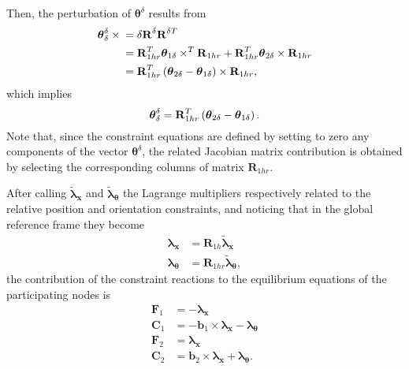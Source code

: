 \documentclass[10pt,dvips,fleqn,subeqn]{report}
\newcommand{\T}[1]{\bm{\mathbf{#1}}}
\begin{document}
Then, the perturbation of $\T{\theta}^{\delta}$ results from
\begin{align}
	\T{\theta}^{\delta}_{\delta} \times{}
	&= \delta\T{R}^{\delta} \T{R}^{\delta T} \nonumber \\
	&= \T{R}_{1hr}^T \T{\theta}_{1\delta}\times^T \T{R}_{1hr}
	+ \T{R}_{1hr}^T \T{\theta}_{2\delta}\times \T{R}_{1hr} \nonumber \\
	&= \T{R}_{1hr}^T \plbr{
		\T{\theta}_{2\delta} - \T{\theta}_{1\delta}
	} \times \T{R}_{1hr} ,
\end{align}
which implies
\begin{equation}
	\T{\theta}^{\delta}_{\delta} = \T{R}_{1hr}^T \plbr{
		\T{\theta}_{2\delta} - \T{\theta}_{1\delta}
	} .
\end{equation}
Note that, since the constraint equations are defined by setting 
to zero any components of the vector $\T{\theta}^{\delta}$, the
related Jacobian matrix contribution is obtained by selecting 
the corresponding columns of matrix $\T{R}_{1hr}$.


After calling $\tilde{\T{\lambda}}_{\T{x}}$
and $\tilde{\T{\lambda}}_{\T{\theta}}$ the Lagrange multipliers
respectively related to the relative position and orientation
constraints, and noticing that in the global reference frame
they become
\begin{subequations}
\begin{align}
	\T{\lambda}_{\T{x}} &= \T{R}_{1h} \tilde{\T{\lambda}}_{\T{x}} \\
	\T{\lambda}_{\T{\theta}} &= \T{R}_{1hr} \tilde{\T{\lambda}}_{\T{\theta}} ,
\end{align}
\end{subequations}
the contribution of the constraint reactions to the equilibrium equations
of the participating nodes is
\begin{subequations}
\begin{align}
	\T{F}_1 &= - \T{\lambda}_{\T{x}} \\
	\T{C}_1 &= - \T{b}_1 \times \T{\lambda}_{\T{x}} - \T{\lambda}_{\T{\theta}} \\
	\T{F}_2 &= \T{\lambda}_{\T{x}} \\
	\T{C}_2 &= \T{b}_2 \times \T{\lambda}_{\T{x}} + \T{\lambda}_{\T{\theta}} .
\end{align}
\end{subequations}
\end{document}
